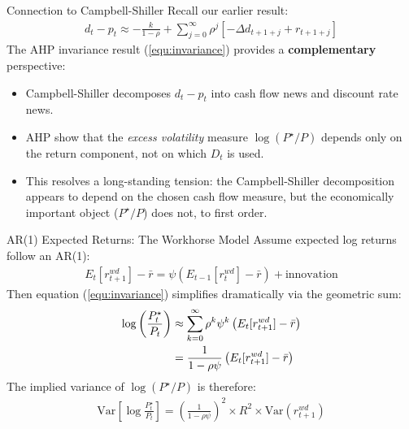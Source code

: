 \documentclass{beamer}
\begin{document}
\begin{frame}{Connection to Campbell-Shiller}
	Recall our earlier result:
	\begin{align*}
		d_t - p_t \approx -\frac{k}{1-\rho} + \sum_{j=0}^{\infty} \rho^j \left[-\Delta d_{t+1+j} + r_{t+1+j}\right]
	\end{align*}
	The AHP invariance result (\ref{equ:invariance}) provides a \textbf{complementary} perspective:
	\begin{itemize}
		\item Campbell-Shiller decomposes $d_t - p_t$ into cash flow news and discount rate news.
		\item AHP show that the \textit{excess volatility} measure $\log(P^\star/P)$ depends only on the return component, not on which $D_t$ is used.
		\item This resolves a long-standing tension: the Campbell-Shiller decomposition appears to depend on the chosen cash flow measure, but the economically important object ($P^\star/P$) does not, to first order.
	\end{itemize}
\end{frame}

\begin{frame}{AR(1) Expected Returns: The Workhorse Model}
	Assume expected log returns follow an AR(1):
	\begin{align}
		E_t[r_{t+1}^{wd}] - \bar{r} = \psi \left(E_{t-1}[r_t^{wd}] - \bar{r}\right) + \text{innovation}
	\end{align}
	Then equation (\ref{equ:invariance}) simplifies dramatically via the geometric sum:
	\begin{align}
		\log\left(\frac{P_t^\star}{P_t}\right) &\approx \sum_{k=0}^{\infty} \rho^k \psi^k \left(E_t[r_{t+1}^{wd}] - \bar{r}\right) \notag\\
		&= \frac{1}{1-\rho\psi} \left(E_t[r_{t+1}^{wd}] - \bar{r}\right) \label{equ:ar1_pstar}
	\end{align}
	The implied variance of $\log(P^\star/P)$ is therefore:
	\begin{align}
		\text{Var}\left[\log\frac{P_t^\star}{P_t}\right] = \left(\frac{1}{1-\rho\psi}\right)^2 \times R^2 \times \text{Var}(r_{t+1}^{wd}) \label{equ:var_pstar}
	\end{align}
\end{frame}
\end{document}
